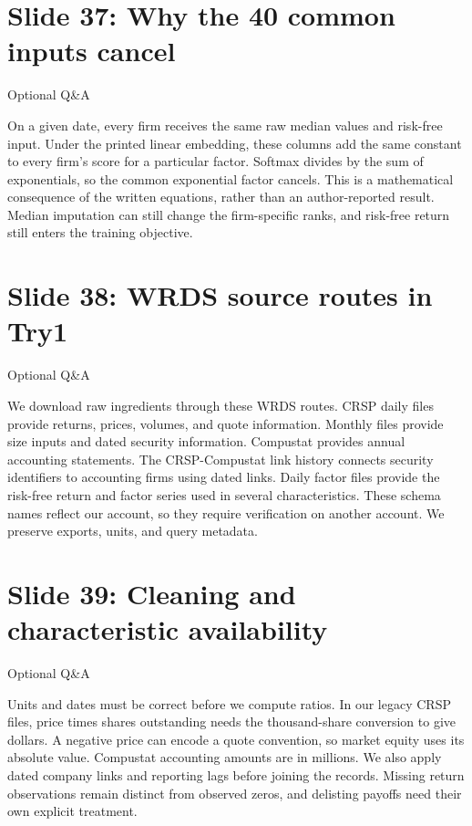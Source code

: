\documentclass[11pt]{article}
\begin{document}
\section*{Slide 37: Why the 40 common inputs cancel}

\textcolor{SBred}{Optional Q\&A}

On a given date, every firm receives the same raw median values and risk-free input. Under the printed linear embedding, these columns add the same constant to every firm's score for a particular factor. Softmax divides by the sum of exponentials, so the common exponential factor cancels. This is a mathematical consequence of the written equations, rather than an author-reported result. Median imputation can still change the firm-specific ranks, and risk-free return still enters the training objective.

\section*{Slide 38: WRDS source routes in Try1}

\textcolor{SBred}{Optional Q\&A}

We download raw ingredients through these WRDS routes. CRSP daily files provide returns, prices, volumes, and quote information. Monthly files provide size inputs and dated security information. Compustat provides annual accounting statements. The CRSP-Compustat link history connects security identifiers to accounting firms using dated links. Daily factor files provide the risk-free return and factor series used in several characteristics. These schema names reflect our account, so they require verification on another account. We preserve exports, units, and query metadata.

\section*{Slide 39: Cleaning and characteristic availability}

\textcolor{SBred}{Optional Q\&A}

Units and dates must be correct before we compute ratios. In our legacy CRSP files, price times shares outstanding needs the thousand-share conversion to give dollars. A negative price can encode a quote convention, so market equity uses its absolute value. Compustat accounting amounts are in millions. We also apply dated company links and reporting lags before joining the records. Missing return observations remain distinct from observed zeros, and delisting payoffs need their own explicit treatment.
\end{document}
